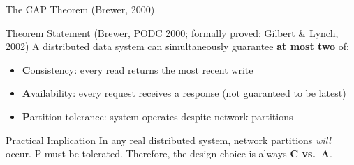 \documentclass[aspectratio=169,10pt]{beamer}
\begin{document}
\begin{frame}{The CAP Theorem (Brewer, 2000)}
      \begin{block}{Theorem Statement (Brewer, PODC 2000; formally proved: Gilbert \& Lynch, 2002)}
        A distributed data system can simultaneously guarantee \textbf{at most two} of:
        \vspace{4pt}
        \begin{itemize}
          \item \textbf{C}onsistency: every read returns the most recent write
          \item \textbf{A}vailability: every request receives a response (not guaranteed to be latest)
          \item \textbf{P}artition tolerance: system operates despite network partitions
        \end{itemize}
      \end{block}
      \vspace{4pt}
      \begin{alertblock}{Practical Implication}
        In any real distributed system, network partitions \emph{will} occur.  P must be tolerated.  Therefore, the design choice is always \textbf{C vs.\ A}.
      \end{alertblock}


\end{frame}
\end{document}
